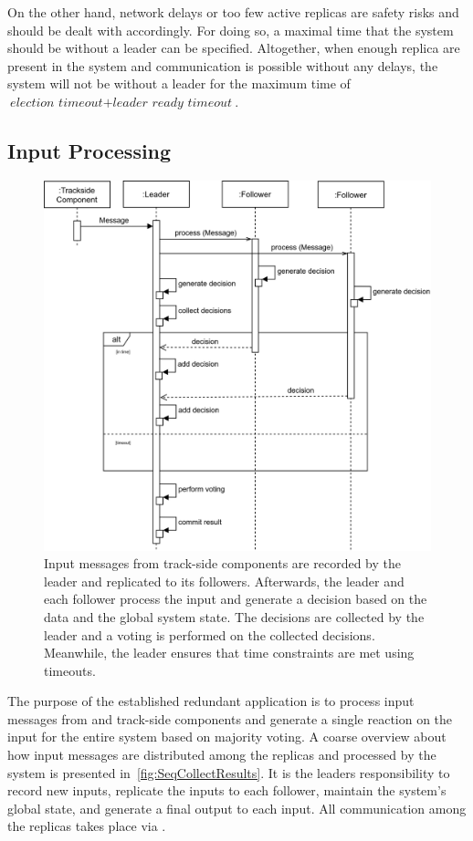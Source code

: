 On the other hand, network delays or too few active replicas are safety risks and should be dealt with accordingly.
For doing so, a maximal time that the system should be without a leader can be specified.
Altogether, when enough replica are present in the system and communication is possible without any delays, the system will not be without a leader for the maximum time of $\textit{election timeout} + \textit{leader ready timeout}$.

\subsection{Input Processing}
\label{subsec:ImpInputProcessing}
\begin{figure}[!hb]
	\centering
	\includegraphics[width=0.75\linewidth]{images/sequence/CollectResults}
	\caption{Input messages from track-side components are recorded by the leader and replicated to its followers. Afterwards, the leader and each follower process the input and generate a decision based on the data and the global system state. The decisions are collected by the leader and a voting is performed on the collected decisions. Meanwhile, the leader ensures that time constraints are met using timeouts.}
	\label{fig:SeqCollectResults}
\end{figure}

The purpose of the established redundant application is to process input messages from  and track-side components and generate a single reaction on the input for the entire system based on majority voting.
A coarse overview about how input messages are distributed among the replicas and processed by the system is presented in~\autoref{fig:SeqCollectResults}.
It is the leaders responsibility to record new inputs, replicate the inputs to each follower, maintain the system's global state, and generate a final output to each input.
All communication among the replicas takes place via .

